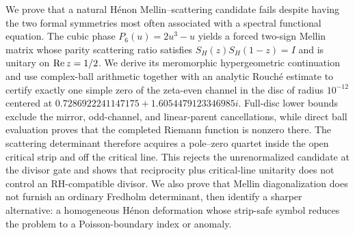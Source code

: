 We prove that a natural H\'enon Mellin--scattering candidate fails despite
having the two formal symmetries most often associated with a spectral
functional equation. The cubic phase $P_6(u)=2u^3-u$ yields a forced
two-sign Mellin matrix whose parity scattering ratio satisfies
$S_H(z)S_H(1-z)=I$ and is unitary on $\operatorname{Re} z=1/2$. We derive its
meromorphic hypergeometric continuation and use complex-ball arithmetic
together with an analytic Rouch\'e estimate to certify exactly one simple
zero of the zeta-even channel in the disc of radius $10^{-12}$ centered at
$0.7286922241147175+1.6054479123346985i$. Full-disc lower bounds exclude
the mirror, odd-channel, and linear-parent cancellations, while direct ball
evaluation proves that the completed Riemann function is nonzero there. The scattering
determinant therefore acquires a pole--zero quartet inside the open critical
strip and off the critical line. This rejects the unrenormalized candidate
at the divisor gate and shows that reciprocity plus critical-line unitarity
does not control an RH-compatible divisor. We also prove that Mellin
diagonalization does not furnish an ordinary Fredholm determinant, then
identify a sharper alternative: a homogeneous H\'enon deformation whose
strip-safe symbol reduces the problem to a Poisson-boundary index or anomaly.
